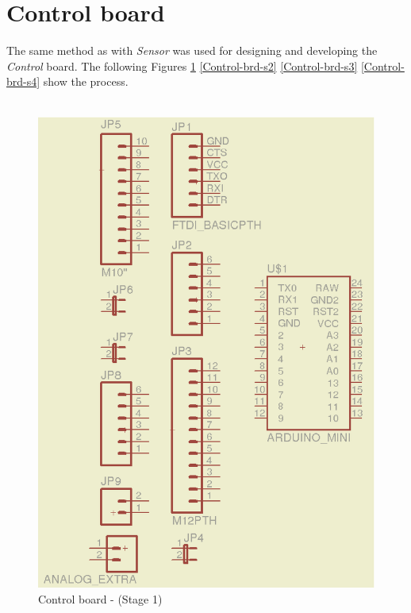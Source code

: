 \documentclass[12pt,a4paper,draft]{report}
\begin{document}
\section{Control board}
The same method as with \textit{Sensor} was used for designing and developing the \textit{Control} board. The following Figures \ref{Control-brd-s1} \ref{Control-brd-s2} \ref{Control-brd-s3} \ref{Control-brd-s4} show the process. \\
\ \\
\begin{figure}[H]
\centering
\includegraphics*[scale=0.25]{control_brd_s1}
\caption{Control board -  (Stage 1)}
\label{Control-brd-s1}
\end{figure}
\ \\
\end{document}
